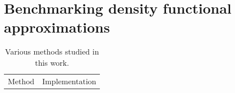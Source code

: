 \section{Benchmarking density functional approximations}
\begin{table}
\centering
\caption{Various methods studied in this work.}
\begin{tabular}{|c|c|} \hline
    Method & Implementation \hline

\end{tabular}
\end{table}